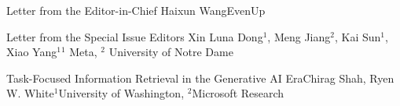 \documentclass[11pt]{article}
\begin{document}


\begin{bulletin}


%
%

\begin{lettersection}


\begin{letter}{Letter from the Editor-in-Chief}
 {Haixun Wang}{EvenUp}
 
\end{letter}

\newpage


\newpage

%
%
\begin{letter}{Letter from the Special Issue Editors}
{Xin Luna Dong$^1$, Meng Jiang$^2$, Kai Sun$^1$, Xiao Yang$^1$}{$^1$ Meta, $^2$ University of Notre Dame}

\end{letter}

\end{lettersection}

\begin{opinionsection}
\begin{opinion}{Task-Focused Information Retrieval in the Generative AI Era}{Chirag Shah, Ryen W. White}{$^1$University of Washington, $^2$Microsoft Research}

\end{opinion}
\end{opinionsection}


\end{bulletin}
\end{document}
